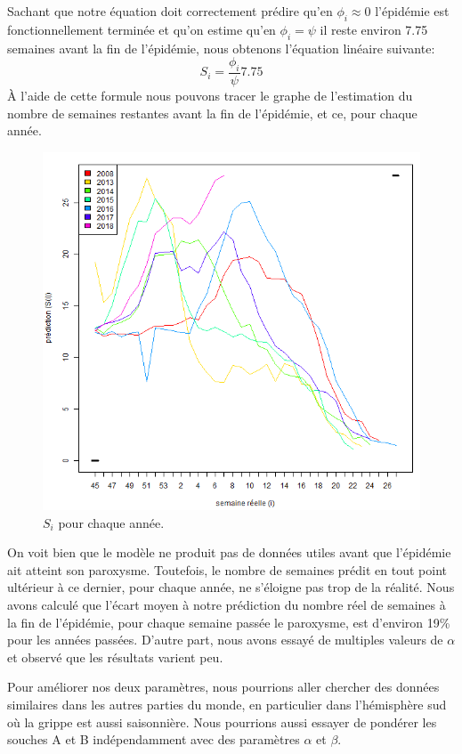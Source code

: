\documentclass[12pt]{article}
\begin{document}
Sachant que notre \'equation doit correctement pr\'edire qu'en $\phi_i \approx 0$ l'\'epid\'emie est
fonctionnellement termin\'ee et qu'on estime qu'en $\phi_i = \psi$ il reste environ 7.75 semaines
avant la fin de l'\'epid\'emie, nous obtenons l'\'equation lin\'eaire suivante:
\[ S_i = \frac{\phi_i}\psi 7.75 \]
\`A l'aide de cette formule nous pouvons tracer le graphe de l'estimation du nombre de semaines
restantes avant la fin de l'\'epid\'emie, et ce, pour chaque ann\'ee.

\begin{figure}[h]
    \centering
    \includegraphics[width=5.5in]{PredictionParAnnee.png}
    \caption{$S_i$ pour chaque ann\'ee.}
\end{figure}

On voit bien que le mod\`ele ne produit pas de donn\'ees utiles avant que l'\'epid\'emie ait atteint
son paroxysme. Toutefois, le nombre de semaines pr\'edit en tout point ult\'erieur \`a ce dernier,
pour chaque ann\'ee, ne s'\'eloigne pas trop de la r\'ealit\'e. Nous avons calcul\'e que l'\'ecart
moyen \`a notre pr\'ediction du nombre r\'eel de semaines \`a la fin de l'\'epid\'emie, pour chaque
semaine pass\'ee le paroxysme, est d'environ 19\% pour les ann\'ees pass\'ees. D'autre part, nous
avons essay\'e de multiples valeurs de $\alpha$ et observ\'e que les r\'esultats varient peu.

Pour am\'eliorer nos deux param\`etres, nous pourrions aller chercher des donn\'ees similaires dans
les autres parties du monde, en particulier dans l'h\'emisph\`ere sud o\`u la grippe est aussi
saisonni\`ere. Nous pourrions aussi essayer de pond\'erer les souches A et B ind\'ependamment avec
des param\`etres $\alpha$ et $\beta$.
\end{document}
